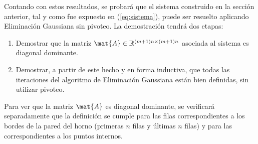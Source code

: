         Contando con estos resultados, se probará que el sistema construido en la sección anterior, tal y como fue expuesto en (\ref{eq:sistema}), puede ser resuelto aplicando Eliminación Gaussiana sin pivoteo. La demostración tendrá dos etapas:
        \begin{enumerate}
            \item Demostrar que la matriz $\mat{A} \in \mathbb{R}^{(m+1)n \times (m+1)n}$ asociada al sistema es diagonal dominante.
            \item Demostrar, a partir de este hecho y en forma inductiva, que todas las iteraciones del algoritmo de Eliminación Gaussiana están bien definidas, sin utilizar pivoteo.
        \end{enumerate}

        Para ver que la matriz $\mat{A}$ es diagonal dominante, se verificará separadamente que la definición se cumple para las filas correspondientes a los bordes de la pared del horno (primeras $n$ filas y últimas $n$ filas) y para las correspondientes a los puntos internos.

